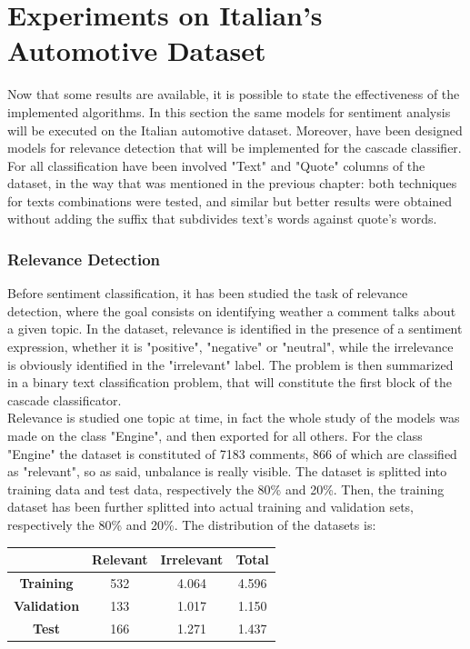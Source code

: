 \section{Experiments on Italian's Automotive Dataset}

Now that some results are available, it is possible to state the effectiveness of the implemented algorithms. In this section the same models for sentiment analysis will be executed on the Italian automotive dataset. Moreover, have been designed models for relevance detection that will be implemented for the cascade classifier. For all classification have been involved "Text" and "Quote" columns of the dataset, in the way that was mentioned in the previous chapter: both techniques for texts combinations were tested, and similar but better results were obtained without adding the suffix that subdivides text's words against quote's words. \\

\subsubsection{Relevance Detection}

Before sentiment classification, it has been studied the task of relevance detection, where the goal consists on identifying weather a comment talks about a given topic. In the dataset, relevance is identified in the presence of a sentiment expression, whether it is "positive", "negative" or "neutral", while the irrelevance is obviously identified in the "irrelevant" label. The problem is then summarized in a binary text classification problem, that will constitute the first block of the cascade classificator.\\
Relevance is studied one topic at time, in fact the whole study of the models was made on the class "Engine", and then exported for all others. For the class "Engine" the dataset is constituted of 7183 comments, 866 of which are classified as "relevant", so as said, unbalance is really visible. The dataset is splitted into training data and test data, respectively the 80\% and 20\%. Then, the training dataset has been further splitted into actual training and validation sets, respectively the 80\% and 20\%. The distribution of the datasets is:

\begin{center}
	\begin{tabular}{ | c  c  c | c | } 
		\hline
		& \textbf{Relevant} & \textbf{Irrelevant} & \textbf{Total} \\
		\hline
		\textbf{Training} & 532 & 4.064 & 4.596 \\ 
		\hline
		\textbf{Validation} & 133 & 1.017 & 1.150 \\ 
		\hline
		\textbf{Test} & 166 & 1.271 & 1.437\\
		\hline
	\end{tabular}
\end{center}


